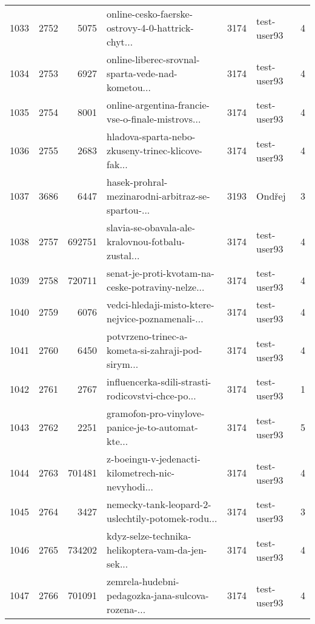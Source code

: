 \begin{tabular}{lrrlrlr}
1033 &       2752 &     5075 &  online-cesko-faerske-ostrovy-4-0-hattrick-chyt... &     3174 &                  test-user93 &               4 \\
1034 &       2753 &     6927 &  online-liberec-srovnal-sparta-vede-nad-kometou... &     3174 &                  test-user93 &               4 \\
1035 &       2754 &     8001 &  online-argentina-francie-vse-o-finale-mistrovs... &     3174 &                  test-user93 &               4 \\
1036 &       2755 &     2683 &  hladova-sparta-nebo-zkuseny-trinec-klicove-fak... &     3174 &                  test-user93 &               4 \\
1037 &       3686 &     6447 &  hasek-prohral-mezinarodni-arbitraz-se-spartou-... &     3193 &                       Ondřej &               3 \\
1038 &       2757 &   692751 &  slavia-se-obavala-ale-kralovnou-fotbalu-zustal... &     3174 &                  test-user93 &               4 \\
1039 &       2758 &   720711 &  senat-je-proti-kvotam-na-ceske-potraviny-nelze... &     3174 &                  test-user93 &               4 \\
1040 &       2759 &     6076 &  vedci-hledaji-misto-ktere-nejvice-poznamenali-... &     3174 &                  test-user93 &               4 \\
1041 &       2760 &     6450 &  potvrzeno-trinec-a-kometa-si-zahraji-pod-sirym... &     3174 &                  test-user93 &               4 \\
1042 &       2761 &     2767 &  influencerka-sdili-strasti-rodicovstvi-chce-po... &     3174 &                  test-user93 &               1 \\
1043 &       2762 &     2251 &  gramofon-pro-vinylove-panice-je-to-automat-kte... &     3174 &                  test-user93 &               5 \\
1044 &       2763 &   701481 &  z-boeingu-v-jedenacti-kilometrech-nic-nevyhodi... &     3174 &                  test-user93 &               4 \\
1045 &       2764 &     3427 &  nemecky-tank-leopard-2-uslechtily-potomek-rodu... &     3174 &                  test-user93 &               3 \\
1046 &       2765 &   734202 &  kdyz-selze-technika-helikoptera-vam-da-jen-sek... &     3174 &                  test-user93 &               4 \\
1047 &       2766 &   701091 &  zemrela-hudebni-pedagozka-jana-sulcova-rozena-... &     3174 &                  test-user93 &               4 \\

\end{tabular}

